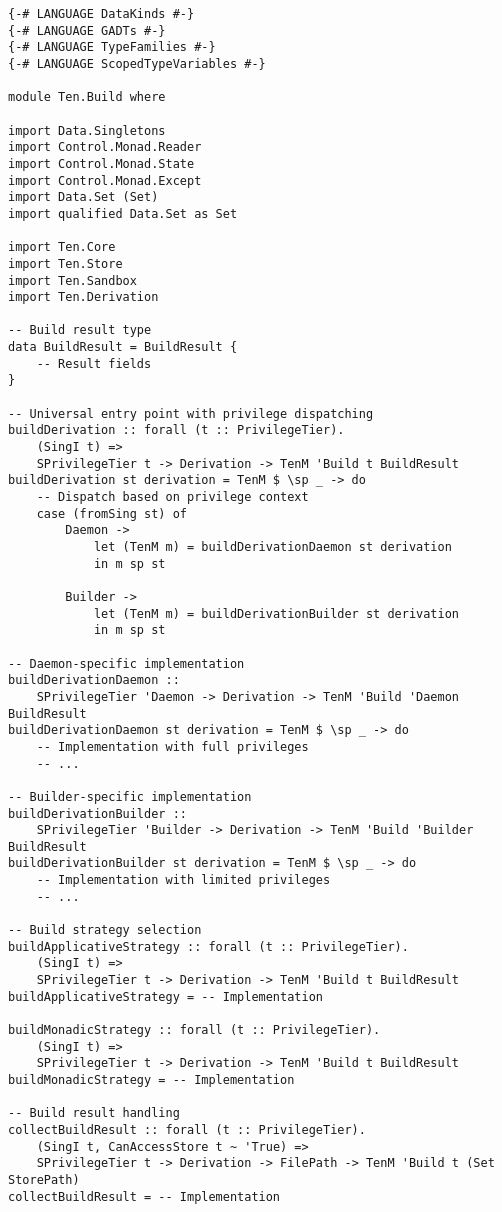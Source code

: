 \documentclass{article}
\begin{document}
\begin{tcolorbox}[title=Ten/Build.hs Changes]
\begin{verbatim}
{-# LANGUAGE DataKinds #-}
{-# LANGUAGE GADTs #-}
{-# LANGUAGE TypeFamilies #-}
{-# LANGUAGE ScopedTypeVariables #-}

module Ten.Build where

import Data.Singletons
import Control.Monad.Reader
import Control.Monad.State
import Control.Monad.Except
import Data.Set (Set)
import qualified Data.Set as Set

import Ten.Core
import Ten.Store
import Ten.Sandbox
import Ten.Derivation

-- Build result type
data BuildResult = BuildResult {
    -- Result fields
}

-- Universal entry point with privilege dispatching
buildDerivation :: forall (t :: PrivilegeTier).
    (SingI t) =>
    SPrivilegeTier t -> Derivation -> TenM 'Build t BuildResult
buildDerivation st derivation = TenM $ \sp _ -> do
    -- Dispatch based on privilege context
    case (fromSing st) of
        Daemon ->
            let (TenM m) = buildDerivationDaemon st derivation
            in m sp st

        Builder ->
            let (TenM m) = buildDerivationBuilder st derivation
            in m sp st

-- Daemon-specific implementation
buildDerivationDaemon ::
    SPrivilegeTier 'Daemon -> Derivation -> TenM 'Build 'Daemon BuildResult
buildDerivationDaemon st derivation = TenM $ \sp _ -> do
    -- Implementation with full privileges
    -- ...

-- Builder-specific implementation
buildDerivationBuilder ::
    SPrivilegeTier 'Builder -> Derivation -> TenM 'Build 'Builder BuildResult
buildDerivationBuilder st derivation = TenM $ \sp _ -> do
    -- Implementation with limited privileges
    -- ...

-- Build strategy selection
buildApplicativeStrategy :: forall (t :: PrivilegeTier).
    (SingI t) =>
    SPrivilegeTier t -> Derivation -> TenM 'Build t BuildResult
buildApplicativeStrategy = -- Implementation

buildMonadicStrategy :: forall (t :: PrivilegeTier).
    (SingI t) =>
    SPrivilegeTier t -> Derivation -> TenM 'Build t BuildResult
buildMonadicStrategy = -- Implementation

-- Build result handling
collectBuildResult :: forall (t :: PrivilegeTier).
    (SingI t, CanAccessStore t ~ 'True) =>
    SPrivilegeTier t -> Derivation -> FilePath -> TenM 'Build t (Set StorePath)
collectBuildResult = -- Implementation


\end{verbatim}
\end{tcolorbox}
\end{document}
